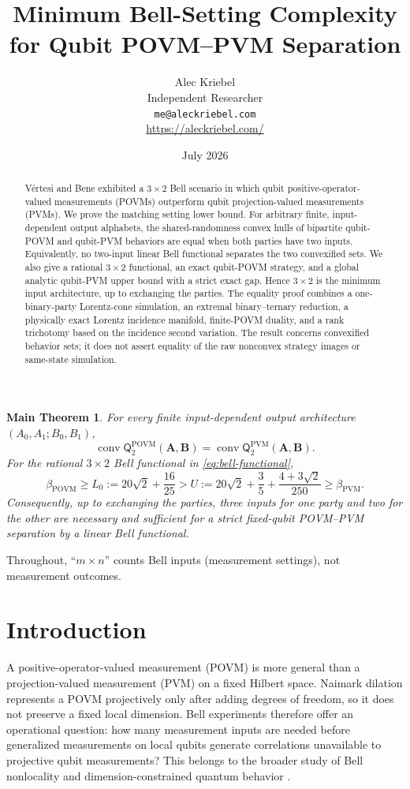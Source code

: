 \documentclass[11pt]{article}
\title{\bfseries Minimum Bell-Setting Complexity\\
for Qubit POVM--PVM Separation}
\author{Alec Kriebel\\
\small Independent Researcher\\
\small \texttt{me@aleckriebel.com}\\
\small \url{https://aleckriebel.com/}}
\date{July 2026}
\newtheorem*{maintheorem}{Main Theorem}
\theoremstyle{definition}
\newcommand{\conv}{\operatorname{conv}}
\newcommand{\Qset}{\mathsf Q}
\newcommand{\POVM}{\mathrm{POVM}}
\newcommand{\PVM}{\mathrm{PVM}}
\begin{document}
\ifdefined\REVIEWVERSION
\linenumbers
\fi
\maketitle

\begin{abstract}
V\'ertesi and Bene exhibited a \(3\times2\) Bell scenario in which qubit
positive-operator-valued measurements (POVMs) outperform qubit
projection-valued measurements (PVMs). We prove the matching setting lower
bound. For arbitrary finite, input-dependent output alphabets, the
shared-randomness convex hulls of bipartite qubit-POVM and qubit-PVM behaviors
are equal when both parties have two inputs. Equivalently, no two-input
linear Bell functional separates the two convexified sets. We also give a
rational \(3\times2\) functional, an exact qubit-POVM strategy, and a global
analytic qubit-PVM upper bound with a strict exact gap. Hence \(3\times2\) is
the minimum input architecture, up to exchanging the parties. The equality
proof combines a one-binary-party Lorentz-cone simulation, an extremal
binary--ternary reduction, a physically exact Lorentz incidence manifold,
finite-POVM duality, and a rank trichotomy based on the incidence second
variation. The result concerns convexified behavior sets; it does not assert
equality of the raw nonconvex strategy images or same-state simulation.
\end{abstract}

\begin{maintheorem}
For every finite input-dependent output architecture
\((A_0,A_1;B_0,B_1)\),
\[
\conv\Qset^{\POVM}_2(\mathbf A,\mathbf B)
=
\conv\Qset^{\PVM}_2(\mathbf A,\mathbf B).
\]
For the rational \(3\times2\) Bell functional in
\cref{eq:bell-functional},
\[
\beta_{\POVM}\ge
L_0:=20\sqrt2+\frac{16}{25}
>
U:=20\sqrt2+\frac35+\frac{4+3\sqrt2}{250}
\ge\beta_{\PVM}.
\]
Consequently, up to exchanging the parties, three inputs for one party and
two for the other are necessary and sufficient for a strict fixed-qubit
POVM--PVM separation by a linear Bell functional.
\end{maintheorem}

\noindent
Throughout, ``\(m\times n\)'' counts Bell inputs (measurement settings), not
measurement outcomes.

\section{Introduction}

A positive-operator-valued measurement (POVM) is more general than a
projection-valued measurement (PVM) on a fixed Hilbert space. Naimark dilation
represents a POVM projectively only after adding degrees of freedom, so it
does not preserve a fixed local dimension. Bell experiments therefore offer
an operational question: how many measurement inputs are needed before
generalized measurements on local qubits generate correlations unavailable
to projective qubit measurements? This belongs to the broader study of Bell
nonlocality and dimension-constrained quantum behavior
\cite{brunner2014,navascues2015}.
\end{document}
